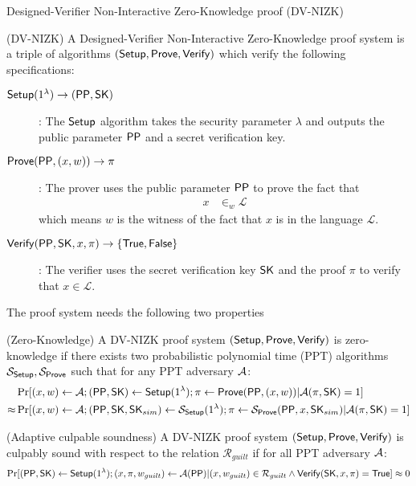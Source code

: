 \begin{subsection}{Designed-Verifier Non-Interactive Zero-Knowledge proof (DV-NIZK)}

  \begin{definition}{(DV-NIZK)} A Designed-Verifier Non-Interactive Zero-Knowledge proof system is a triple of algorithms $({\mathsf{Setup}}, {\mathsf{Prove}}, {\mathsf{Verify}})$ which verify the following specifications:
    \begin{description}
    \item[${\mathsf{Setup}}(1^\lambda) \to ({\mathsf{PP}}, \mathsf{SK})$]: The ${\mathsf{Setup}}$ algorithm takes the security parameter $\lambda$ and outputs the public parameter ${\mathsf{PP}}$ and a secret verification key.
    \item[${\mathsf{Prove}}({\mathsf{PP}}, (x, w)) \to \pi$]: The prover uses the public parameter ${\mathsf{PP}}$ to prove the fact that
      \begin{align*}
        x &\in_w \mathcal{L}
      \end{align*}
      which means $w$ is the witness of the fact that $x$ is in the language $\mathcal{L}$.
    \item[${\mathsf{Verify}}({\mathsf{PP}}, \mathsf{SK}, x, \pi) \to \{\mathsf{True}, \mathsf{False}\}$]: The verifier uses the secret verification key $\mathsf{SK}$ and the proof $\pi$ to verify that $x \in \mathcal{L}$.
    \end{description}

    The proof system needs the following two properties

    \begin{property}{(Zero-Knowledge)}
      A DV-NIZK proof system $({\mathsf{Setup}}, {\mathsf{Prove}}, {\mathsf{Verify}})$ is zero-knowledge if there exists two probabilistic polynomial time (PPT) algorithms $\mathcal{S}_{{\mathsf{Setup}}}, \mathcal{S}_{{\mathsf{Prove}}}$ such that for any PPT adversary $\mathcal{A}$:
      \begin{align*}
        &\Pr[(x, w) \gets \mathcal{A}; ({\mathsf{PP}},\mathsf{SK}) \gets {\mathsf{Setup}}(1^\lambda); \pi \gets {\mathsf{Prove}}({\mathsf{PP}}, (x,w)) | \mathcal{A}(\pi, \mathsf{SK}) = 1]\\
        \approx &\Pr[(x, w) \gets \mathcal{A}; ({\mathsf{PP}},\mathsf{SK}, \mathsf{SK}_{sim}) \gets \mathcal{S}_{{\mathsf{Setup}}}(1^\lambda); \pi \gets \mathcal{S}_{{\mathsf{Prove}}}({\mathsf{PP}}, x, \mathsf{SK}_{sim}) | \mathcal{A}(\pi, \mathsf{SK}) = 1]
      \end{align*}
    \end{property}



    \begin{property}{(Adaptive culpable soundness)}
      A DV-NIZK proof system $({\mathsf{Setup}}, {\mathsf{Prove}}, {\mathsf{Verify}})$ is culpably sound with respect to the relation $\mathcal{R}_{guilt}$ if for all PPT adversary $\mathcal{A}$:
      \begin{align*}
        \Pr[({\mathsf{PP}}, \mathsf{SK}) \gets {\mathsf{Setup}}(1^{\lambda}); (x, \pi, w_{guilt}) \gets \mathcal{A}({\mathsf{PP}}) | (x, w_{guilt}) \in \mathcal{R}_{guilt} \wedge {\mathsf{Verify}}(\mathsf{SK}, x, \pi) = \mathsf{True}] \approx 0
      \end{align*}
    \end{property}



  \end{definition}



\end{subsection}
